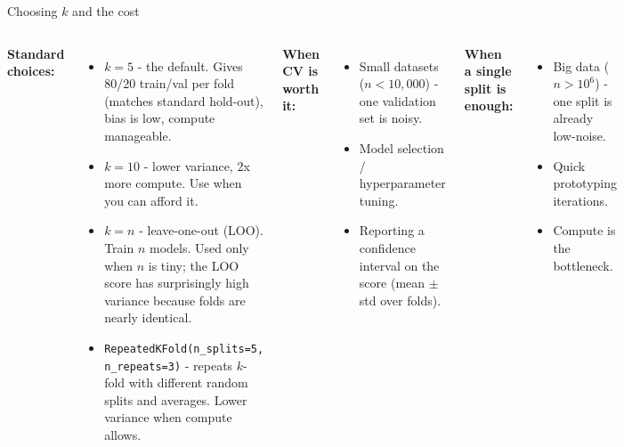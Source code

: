 \documentclass[aspectratio=169]{beamer}
\begin{document}
\begin{frame}{Choosing $k$ and the cost}
  \begin{columns}[T]
    \textbf{Standard choices:}
    \begin{itemize}\small
      \item $k = 5$ - the default. Gives 80/20 train/val per fold (matches standard hold-out), bias is low, compute manageable.
      \item $k = 10$ - lower variance, 2x more compute. Use when you can afford it.
      \item $k = n$ - leave-one-out (LOO). Train $n$ models. Used only when $n$ is tiny; the LOO score has surprisingly high variance because folds are nearly identical.
      \item \texttt{RepeatedKFold(n\_splits=5, n\_repeats=3)} - repeats $k$-fold with different random splits and averages. Lower variance when compute allows.
    \end{itemize}
    \textbf{When CV is worth it:}
    \begin{itemize}\small
      \item Small datasets ($n < 10{,}000$) - one validation set is noisy.
      \item Model selection / hyperparameter tuning.
      \item Reporting a confidence interval on the score (mean $\pm$ std over folds).
    \end{itemize}
    \textbf{When a single split is enough:}
    \begin{itemize}\small
      \item Big data ($n > 10^6$) - one split is already low-noise.
      \item Quick prototyping iterations.
      \item Compute is the bottleneck.
    \end{itemize}
  \end{columns}
\end{frame}
\end{document}
